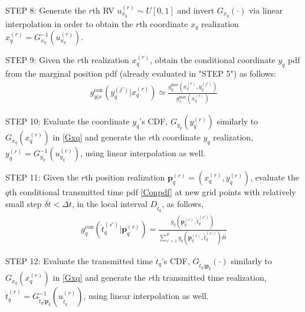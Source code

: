 \documentclass[review]{elsarticle}
\begin{document}
STEP 8: Generate the $r$th RV $u_{x_q}^{(r)}\sim U[0,1]$ and invert $G_{x_q}(\cdot)$ via linear interpolation in order to obtain the $r$th coordinate $x_q$ realization $x_q^{(r)}=G_{x_q}^{-1}(u_{x_q}^{(r)})$.

STEP 9: Given the $r$th realization $x_q^{(r)}$, obtain the conditional coordinate $y_q$ pdf from the marginal position pdf (already evaluated in "STEP 5") as follows:
\begin{align}\label{step9}
    g_{y\vert x}^{\text{con}}(y_q^{(j')}\vert x_q^{(r)})\simeq \frac{g_{q}^{\text{mar}}(x_q^{(r)},y_q^{(j')})}{g_{x}^{\text{mar}}(x_q^{(r)})}
\end{align}

STEP 10: Evaluate the coordinate $y_q$'s CDF, $G_{y_q}(y_q^{(r)})$ similarly to $G_{x_q}(x_q^{(r)})$ in \eqref{Gxq} and generate the $r$th coordinate $y_q$ realization, $y_q^{(r)}=G_{y_q}^{-1}(u_{y_q}^{(r)})$, using linear interpolation as well.

STEP 11: Given the $r$th position realization $\boldsymbol{p}_q^{(r)}=(x_q^{(r)},y_q^{(r)})$, evaluate the $q$th conditional transmitted time pdf \eqref{Conpdf} at new grid points with relatively small step $\delta \mathring{t}<\Delta \mathring{t}$, in the local interval $D_{\mathring{t}_q}$, as follows,
\begin{align}
    g_{q}^{\text{con}}(\mathring{t}_q^{(s')} \vert \boldsymbol{p}_q^{(r)})=\frac{g_q(\boldsymbol{p}_q^{(r)},\mathring{t}_q^{(s')})}{\sum_{s'=1}^{S'} g_q(\boldsymbol{p}_q^{(r)},\mathring{t}_q^{(s')})\delta\mathring{t}}
\end{align}

STEP 12: Evaluate the transmitted time $\mathring{t}_q$'s CDF, $G_{\mathring{t}_q\vert \boldsymbol{p}_q}(\cdot)$ similarly to $G_{x_q}(x_q^{(r)})$ in \eqref{Gxq} and generate the $r$th transmitted time realization, $\mathring{t}_q^{(r)}=G^{-1}_{\mathring{t}_q\vert \boldsymbol{p}_q}(u_{\mathring{t}_q}^{(r)})$, using linear interpolation as well.
\end{document}
